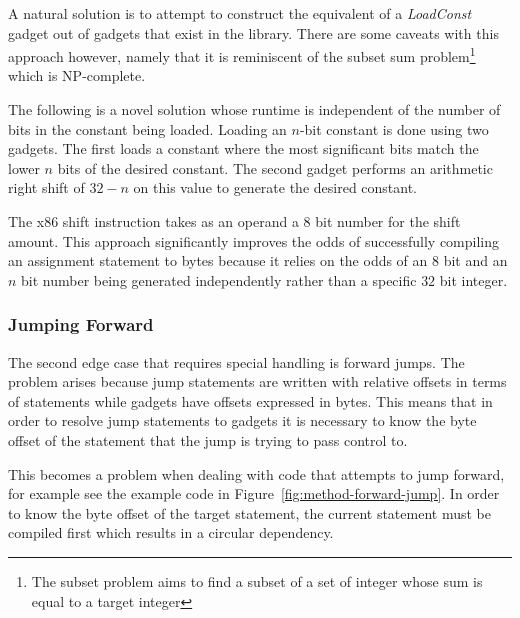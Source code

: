     A natural solution is to attempt to construct the equivalent of a
    \emph{LoadConst} gadget out of gadgets that exist in the library. There are
    some caveats with this approach however, namely that it is reminiscent of
    the subset sum problem\footnote{The subset problem aims to find a subset of
    a set of integer whose sum is equal to a target integer} which is
    NP-complete.

    The following is a novel solution whose runtime is independent of the number
    of bits in the constant being loaded. Loading an $n$-bit constant is done
    using two gadgets. The first loads a constant where the most significant
    bits match the lower $n$ bits of the desired constant. The second gadget
    performs an arithmetic right shift of $32-n$ on this value to generate the
    desired constant.

    The x86 shift instruction takes as an operand a $8$ bit number for the
    shift amount. This approach significantly improves the odds of successfully
    compiling an assignment statement to bytes because it relies on the odds of
    an $8$ bit and an $n$ bit number being generated independently rather than a
    specific $32$ bit integer.

    \subsubsection{Jumping Forward}

    The second edge case that requires special handling is forward jumps. The
    problem arises because jump statements are written with relative offsets in
    terms of statements while gadgets have offsets expressed in bytes. This
    means that in order to resolve jump statements to gadgets it is necessary to
    know the byte offset of the statement that the jump is trying to pass
    control to.

    This becomes a problem when dealing with code that attempts to jump forward,
    for example see the example code in Figure~\ref{fig:method-forward-jump}.
    In order to know the byte offset of the target statement, the current
    statement must be compiled first which results in a circular dependency.

